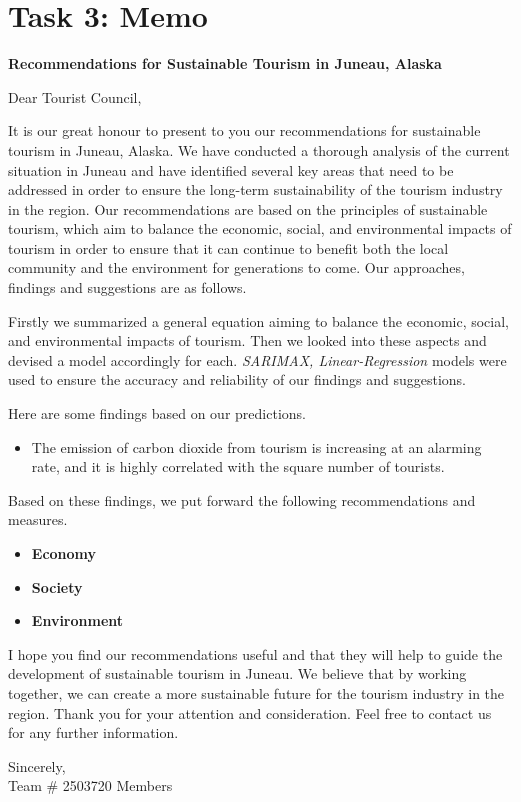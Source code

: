 \section{Task 3: Memo}
\begin{center}
    \Large\textbf{Recommendations for Sustainable Tourism in Juneau, Alaska}
\end{center}

{\small

Dear Tourist Council,

It is our great honour to present to you our recommendations for 
sustainable tourism in Juneau, Alaska. We have conducted a thorough 
analysis of the current situation in Juneau and have identified several key 
areas that need to be addressed in order to ensure the long-term sustainability 
of the tourism industry in the region. 
Our recommendations are based on the principles of sustainable tourism, 
which aim to balance the economic, social, and environmental impacts of tourism 
in order to ensure that it can continue to benefit both the local community and 
the environment for generations to come. Our approaches, findings and suggestions are as follows.

Firstly we summarized a general equation aiming to balance the economic, social, 
and environmental impacts of tourism. Then we looked into these aspects
and devised a model accordingly for each. \textit{SARIMAX, Linear-Regression} models 
were used to ensure the accuracy and reliability of our findings and suggestions.

Here are some findings based on our predictions.

\begin{itemize}
    \item The emission of carbon dioxide from tourism is increasing at an alarming rate, and it is 
    highly correlated with the square number of tourists.
\end{itemize}

Based on these findings, we put forward the following recommendations and measures.

\begin{itemize}
    \item \textbf{Economy}
    \item \textbf{Society}
    \item \textbf{Environment}
\end{itemize}

I hope you find our recommendations useful and that they will help to guide
the development of sustainable tourism in Juneau. We believe that by working
together, we can create a more sustainable future for the tourism industry in
the region. Thank you for your attention and consideration. Feel free to contact us for any further information.

\begin{flushright}
    Sincerely,\\
    Team \# 2503720 Members
    \end{flushright}

}

\clearpage